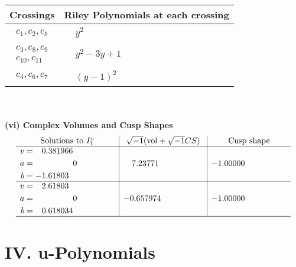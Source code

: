 \documentclass[1p]{elsarticle_modified}
\theoremstyle{definition}
\newcommand{\I}{\sqrt{-1}}
\begin{document}
\begin{tabular}{m{50pt}|m{274pt}}
Crossings & \hspace{64pt}Riley Polynomials at each crossing \\
\hline $$\begin{aligned}c_{1},c_{2},c_{5}\end{aligned}$$&$\begin{aligned}
&y^2
\end{aligned}$\\
\hline $$\begin{aligned}c_{3},c_{8},c_{9}\\c_{10},c_{11}\end{aligned}$$&$\begin{aligned}
&y^2-3 y+1
\end{aligned}$\\
\hline $$\begin{aligned}c_{4},c_{6},c_{7}\end{aligned}$$&$\begin{aligned}
&(y-1)^2
\end{aligned}$\\
\hline
\end{tabular}\\~\\
\newpage\flushleft \textbf{(vi) Complex Volumes and Cusp Shapes}
$$\begin{array}{c|c|c}  
\text{Solutions to }I^v_{1}& \I (\text{vol} + \sqrt{-1}CS) & \text{Cusp shape}\\
 \hline 
\begin{aligned}
v &= \phantom{-}0.381966\phantom{ +0.000000I} \\
a &= \phantom{-0.000000 } 0 \\
b &= -1.61803\phantom{ +0.000000I}\end{aligned}
 & \phantom{-}7.23771\phantom{ +0.000000I} & -1.00000\phantom{ +0.000000I} \\ \hline\begin{aligned}
v &= \phantom{-}2.61803\phantom{ +0.000000I} \\
a &= \phantom{-0.000000 } 0 \\
b &= \phantom{-}0.618034\phantom{ +0.000000I}\end{aligned}
 & -0.657974\phantom{ +0.000000I} & -1.00000\phantom{ +0.000000I}\\
 \hline 
 \end{array}$$\newpage
\newpage\renewcommand{\arraystretch}{1}
\centering \section*{ IV. u-Polynomials}
\end{document}

